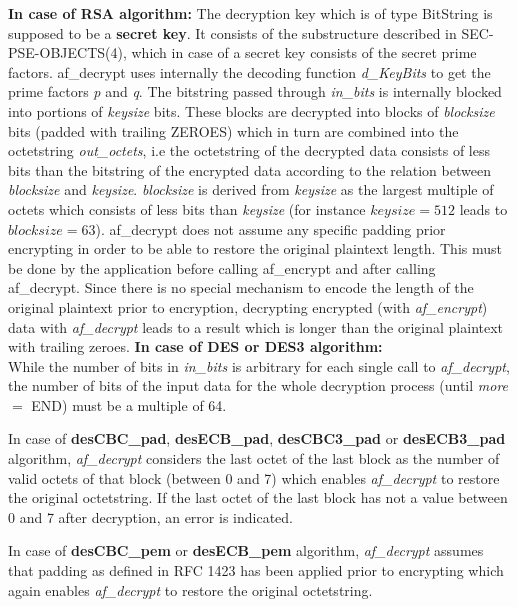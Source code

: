 {\bf In case of RSA algorithm:}
\be
\m The decryption key which is of type BitString is supposed to be
   a {\bf secret key}. It consists of the substructure described in
   SEC-PSE-OBJECTS(4),
   which in case of a secret key consists of the secret
   prime factors. af\_decrypt uses internally the
   decoding function {\em d\_KeyBits} to get the prime factors {\em p} and {\em q}.
\m The bitstring passed through {\em in\_bits} is internally blocked into portions of
   {\em keysize} bits. These blocks are decrypted into blocks of {\em blocksize} bits
   (padded with trailing ZEROES) which in turn are combined into the octetstring {\em out\_octets}, i.e
   the octetstring of the decrypted data consists of less bits than the bitstring of the encrypted data
   according to the relation between {\em blocksize} and {\em keysize}.
   {\em blocksize} is derived from {\em keysize} as the largest multiple of octets which consists of
   less bits than {\em keysize} (for instance $keysize = 512$ leads to $blocksize = 63$).
\m af\_decrypt does not assume any specific padding prior encrypting in order to be able to
   restore the original plaintext length. This must be done by the application before 
   calling  af\_encrypt and after calling af\_decrypt.
\m Since there is no special mechanism to encode the length of the original plaintext prior
   to encryption, decrypting encrypted (with {\em af\_encrypt}) data with {\em af\_decrypt}
   leads to a result which is longer than the original plaintext with trailing zeroes.
\ee
{\bf In case of DES or DES3 algorithm:} \\ [1em]
   While the number of bits in {\em in\_bits} is arbitrary for each single call to
   {\em af\_decrypt}, the number of bits of the input data for the whole
   decryption process (until {\em more} $=$ END) must be a multiple of 64.

   In case of {\bf desCBC\_pad}, {\bf desECB\_pad}, {\bf desCBC3\_pad} or 
   {\bf desECB3\_pad} algorithm, {\em af\_decrypt} considers 
   the last octet of the last block as the number of 
   valid octets of that block (between 0 and 7) which enables {\em af\_decrypt}
   to restore the original octetstring. If the last octet of the last block has not
   a value between 0 and 7 after decryption, an error is indicated.

   In case of {\bf desCBC\_pem} or {\bf desECB\_pem} algorithm, {\em af\_decrypt} assumes
   that padding as defined in RFC 1423 has been applied prior to encrypting
   which again enables {\em af\_decrypt}
   to restore the original octetstring.

